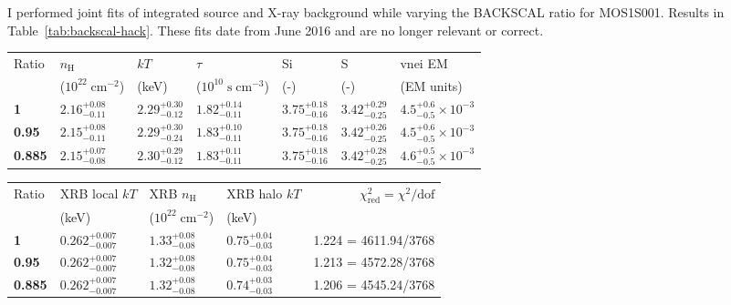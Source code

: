 \documentclass[preprint2,tighten,trackchanges]{aastex6}
\newcommand*{\mt}{\mathrm}
\newcommand*{\unit}[1]{\;\mt{#1}}  %
\begin{document}
I performed joint fits of integrated source and X-ray background while
varying the BACKSCAL ratio for MOS1S001.
Results in Table~\ref{tab:backscal-hack}.
These fits date from June 2016 and are no longer relevant or correct.

\begin{table*}[!h]
    \centering
    \caption{2009 (Motch) MOS1 BACKSCAL ratio has very little effect on fits
        \label{tab:backscal-hack}}

    \begin{tabular}{@{}lllllll@{}}
    \toprule
    Ratio & $n_\mathrm{H}$ & $kT$ & $\tau$ & Si & S & vnei EM \\
     & ($10^{22} \unit{cm^{-2}}$) & (keV) & ($10^{10} \unit{s\;cm^{-3}}$) & (-) & (-) & (EM units) \\
    \midrule
    \textbf{1}     & ${2.16}^{+0.08}_{-0.11}$ & ${2.29}^{+0.30}_{-0.12}$ & ${1.82}^{+0.14}_{-0.11}$
          & ${3.75}^{+0.18}_{-0.16}$ & ${3.42}^{+0.29}_{-0.25}$ & ${4.5}^{+0.6}_{-0.5} \times 10^{-3}$ \\
    \textbf{0.95}  & $2.15^{+0.08}_{-0.11}$ & $2.29^{+0.30}_{-0.24}$ & $1.83^{+0.10}_{-0.11}$  %
          & $3.75^{+0.18}_{-0.16}$ & $3.42^{+0.26}_{-0.25}$ & $4.5^{+0.6}_{-0.5} \times 10^{-3}$ \\ %
    \textbf{0.885} & ${2.15}^{+0.07}_{-0.08}$ & ${2.30}^{+0.29}_{-0.12}$ & ${1.83}^{+0.11}_{-0.11}$
          & ${3.75}^{+0.18}_{-0.16}$ & ${3.42}^{+0.28}_{-0.25}$ & ${4.6}^{+0.5}_{-0.5} \times 10^{-3}$ \\
    \bottomrule
    \end{tabular}

    \quad
    \quad

    \begin{tabular}{@{}llllr@{}}
    \toprule
    Ratio & XRB local $kT$ & XRB $n_\mathrm{H}$ & XRB halo $kT$
           & $\chi^2_{\mathrm{red}} = \chi^2/\mathrm{dof}$ \\
     & (keV) & ($10^{22} \unit{cm^{-2}}$) & (keV) &  \\
    \midrule
    \textbf{1} & ${0.262}^{+0.007}_{-0.007}$ & ${1.33}^{+0.08}_{-0.08}$ & ${0.75}^{+0.04}_{-0.03}$
          & 1.224 = 4611.94/3768 \\
    \textbf{0.95} & ${0.262}^{+0.007}_{-0.007}$ & $1.32^{+0.08}_{-0.08}$ & $0.75^{+0.04}_{-0.03}$ %
          & 1.213 = 4572.28/3768 \\
    \textbf{0.885} & ${0.262}^{+0.007}_{-0.007}$ & ${1.32}^{+0.08}_{-0.08}$ & ${0.74}^{+0.03}_{-0.03}$
          & 1.206 = 4545.24/3768 \\
    \bottomrule
    \end{tabular}
\end{table*}
\end{document}
